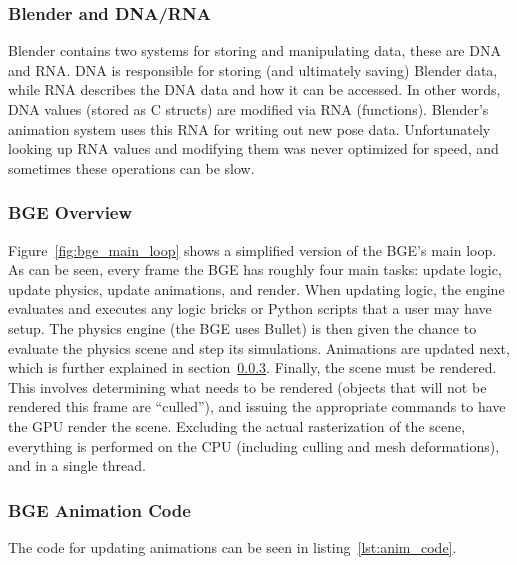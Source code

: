 \subsubsection{Blender and DNA/RNA}
\label{sec:bf_dna_rna}

Blender contains two systems for storing and manipulating data, these are DNA and RNA. DNA is responsible for storing (and ultimately saving) Blender data, while RNA describes the DNA data and how it can be accessed.
In other words, DNA values (stored as C structs) are modified via RNA (functions).
Blender's animation system uses this RNA for writing out new pose data.
Unfortunately looking up RNA values and modifying them was never optimized for speed, and sometimes these operations can be slow.

\subsubsection{BGE Overview}
\label{sec:bge_general_overview}


Figure~\ref{fig:bge_main_loop} shows a simplified version of the BGE's main loop.
As can be seen, every frame the BGE has roughly four main tasks: update logic, update physics, update animations, and render.
When updating logic, the engine evaluates and executes any logic bricks or Python scripts that a user may have setup.
The physics engine (the BGE uses Bullet) is then given the chance to evaluate the physics scene and step its simulations.
Animations are updated next, which is further explained in section~\ref{sec:bge_anim_overview}.
Finally, the scene must be rendered.
This involves determining what needs to be rendered (objects that will not be rendered this frame are ``culled''), and issuing the appropriate commands to have the GPU render the scene.
Excluding the actual rasterization of the scene, everything is performed on the CPU (including culling and mesh deformations), and in a single thread.

\subsubsection{BGE Animation Code}
\label{sec:bge_anim_overview}

The code for updating animations can be seen in listing~\ref{lst:anim_code}.


